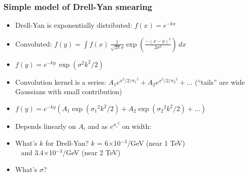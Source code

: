 \documentclass[compress]{beamer}
\begin{document}
\begin{frame}
\frametitle{Simple model of Drell-Yan smearing}
\begin{itemize}\setlength{\itemsep}{0.25 cm}
\item<1-> Drell-Yan is exponentially distributed: $f(x) = e^{-kx}$
\item<1-> Convoluted: $\displaystyle f(y) = \int f(x) \, \frac{1}{\sqrt{2\pi}\sigma} \exp\left(\frac{-(x-y)^2}{2\sigma^2}\right) \, dx$
\item<1-> $f(y) = e^{-ky} \, \exp(\sigma^2 k^2 / 2)$
\item<1-> Convolution kernel is a series: $A_1 e^{x^2/2/{\sigma_1}^2} + A_2 e^{x^2/2/{\sigma_2}^2} + \ldots$ (``tails'' are wide Gaussians with small contribution)
\item<1-> $f(y) = e^{-ky} (A_1 \exp({\sigma_1}^2 k^2 / 2) + A_2 \exp({\sigma_2}^2 k^2 / 2) + \ldots)$
\item<1-> Depends linearly on $A_i$ and as $e^{{\sigma_i}^2}$ on width: 
\end{itemize}

\vfill
\begin{itemize}
\item<2->What's $k$ for Drell-Yan? \hfill $k$ = 6$\times$10$^{-3}$/GeV (near 1 TeV) \\ \mbox{ } \hfill and 3.4$\times$10$^{-3}$/GeV (near 2 TeV)
\item<2->What's $\sigma$?
\end{itemize}
\end{frame}
\end{document}
